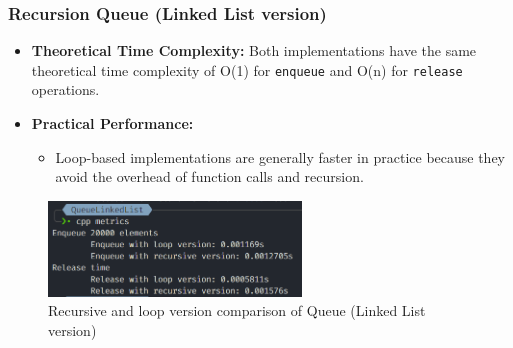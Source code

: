 \subsubsection*{Recursion Queue (Linked List version)}
\begin{itemize}
	\item \textbf{Theoretical Time Complexity:} Both implementations have the same theoretical time complexity of O(1) for \verb|enqueue| and O(n) for  \verb|release| operations.
	\item \textbf{Practical Performance:}
	      \begin{itemize}
		      \item  Loop-based implementations are generally faster in practice because they avoid the overhead of function calls and recursion.
	      \end{itemize}
\end{itemize}
\begin{figure}[!ht]
	\centering
	\includegraphics[width=0.6\textwidth]{imgs/QueueLinkedList/metrics.png}
	\caption{Recursive and loop version comparison of Queue (Linked List version)}\label{fig:queue_ll_metrics}
\end{figure}